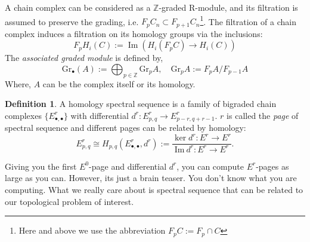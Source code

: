 \documentclass[a4paper,11pt]{article}
\theoremstyle{definition}
\newtheorem{definition}[theorem]{Definition}
\theoremstyle{remark}
\begin{document}
A chain complex can be considered as a $\mathbb{Z}$-graded R-module, and its filtration is assumed to preserve the grading, i.e. $F_p C_n\subset F_{p+1} C_n$\footnote{Here and above we use the abbreviation $F_p C:=F_p\cap C$}. The filtration of a chain complex induces a filtration on its homology groups via the inclusions:
\[
F_pH_i(C):=\operatorname{Im}(H_i(F_pC)\to H_i(C))
\]
The {\itshape associated graded module} is defined by,
\begin{equation}
	\mathrm{Gr}_\bullet(A):=\bigoplus_{p\in\mathbb{Z}}\mathrm{Gr}_pA,\quad\mathrm{Gr}_pA:=F_pA/F_{p-1}A
\end{equation}
Where, $A$ can be the complex itself or its homology.

\begin{definition}
	A homology spectral sequence is a family of bigraded chain complexes $\{E^r_{\bullet,\bullet}\}$ with differential $d^r:E^r_{p,q}\to E^r_{p-r,q+r-1}$. $r$ is called the {\itshape page} of spectral sequence and different pages can be related by homology:
	\[
	E_{p,q}^r\cong H_{p,q}(E^r_{\bullet,\bullet},d^r):=\frac{\ker d^r:E^r\to E^r}{\mathrm{Im~}d^r:E^r\to E^r}.
	\]
\end{definition}

Giving you the first $E^0$-page and differential $d^r$, you can compute $E^r$-pages as large as you can. However, its just a brain teaser. You don't know what you are computing. What we really care about is spectral sequence that can be related to our topological problem of interest.
\end{document}
